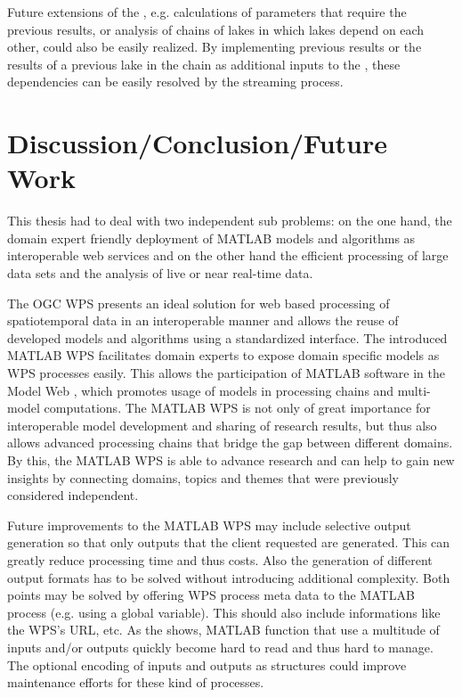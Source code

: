     Future extensions of the \la, e.g. calculations of parameters that require the previous results, or analysis of chains of lakes in which lakes depend on each other, could also be easily realized. By implementing previous results or the results of a previous lake in the chain as additional inputs to the \la, these dependencies can be easily resolved by the streaming process.

\chapter{Discussion/Conclusion/Future Work}
  This thesis had to deal with two independent sub problems: on the one hand, the domain expert friendly deployment of MATLAB models and algorithms as interoperable web services and on the other hand the efficient processing of large data sets and the analysis of live or near real-time data.

  The \ac{OGC} \acl{WPS} presents an ideal solution for web based processing of spatiotemporal data in an interoperable manner and allows the reuse of developed models and algorithms using a standardized interface. The introduced MATLAB WPS facilitates domain experts to expose domain specific models as WPS processes easily. This allows the participation of MATLAB software in the Model Web \citep{geller2008looking}, which promotes usage of models in processing chains and multi-model computations. The MATLAB WPS is not only of great importance for interoperable model development and sharing of research results, but thus also allows advanced processing chains that bridge the gap between different domains. By this, the MATLAB WPS is able to advance research and can help to gain new insights by connecting domains, topics and themes that were previously considered independent.

  Future improvements to the MATLAB WPS may include selective output generation so that only outputs that the client requested are generated. This can greatly reduce processing time and thus costs. Also the generation of different output formats has to be solved without introducing additional complexity. Both points may be solved by offering WPS process meta data to the MATLAB process (e.g. using a global variable). This should also include informations like the WPS's URL, etc. As the \la shows, MATLAB function that use a multitude of inputs and/or outputs quickly become hard to read and thus hard to manage. The optional encoding of inputs and outputs as structures could improve maintenance efforts for these kind of processes.

